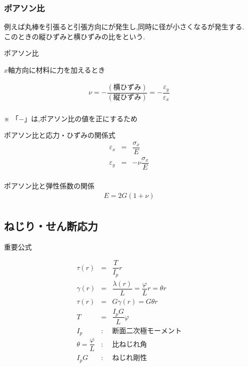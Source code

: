 \documentclass[a4paper]{jsarticle}
\begin{document}
\subsubsection{ポアソン比}
例えば丸棒を引張ると引張方向にが発生し,同時に径が小さくなるが発生する.\\
このときの縦ひずみと横ひずみの比をという.
\begin{itembox}[l]{ポアソン比}
    \begin{center}
        $x$軸方向に材料に力を加えるとき
    \end{center}
    \begin{eqnarray*}
        \nu=-\dfrac{\left(横ひずみ\right)}{\left(縦ひずみ\right)}=-\dfrac{\varepsilon_y}{\varepsilon_x}\\
    \end{eqnarray*}
    \begin{center}
        ※ 「$-$」は,ポアソン比の値を正にするため
    \end{center}
\end{itembox}
\begin{itembox}[l]{ポアソン比と応力・ひずみの関係式}
    \begin{eqnarray*}
        \varepsilon_x&=&\dfrac{\sigma_x}{E}\\
        \varepsilon_y&=&-\nu\dfrac{\sigma_x}{E}\\
    \end{eqnarray*}
\end{itembox}
\begin{itembox}[l]{ポアソン比と弾性係数の関係}
    \begin{eqnarray*}
        E=2G\left(1+\nu\right)\\
    \end{eqnarray*}
\end{itembox}
\subsection{ねじり・せん断応力}
\begin{itembox}[l]{重要公式}
    \begin{center}
        \begin{eqnarray*}
            \tau\left(r\right)&=&\dfrac{T}{I_p} r\\
            \gamma\left(r\right)&=&\dfrac{\lambda\left(r\right)}{L}=\dfrac{\varphi}{L}r=\theta r\\
            \tau\left(r\right)&=&G\gamma\left(r\right)=G\theta r\\
            T&=&\dfrac{I_pG}{L}\varphi\\
            I_p&:&断面二次極モーメント\\
            \theta=\dfrac{\varphi}{L}&:&比ねじれ角\\
            I_pG&:&ねじれ剛性\\
        \end{eqnarray*}
    \end{center}
\end{itembox}
\end{document}
